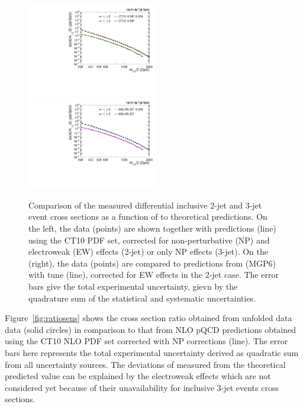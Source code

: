 \begin{figure}[!h]
 \hspace*{-5mm}\includegraphics[width=0.51\textwidth]{Plots_HT_2_150/Comparison_data_theory_EW.pdf}%
 ~~\includegraphics[width=0.51\textwidth]{Plots_HT_2_150/Comparison_data_MC_EW.pdf}\\
 \caption{Comparison of the measured differential inclusive 2-jet and 3-jet event cross sections as a function of \httwo to theoretical predictions. On the left, the data (points) are shown together with \NLOJETPP predictions (line) using the CT10 PDF set, corrected for non-perturbative (NP) and electroweak (EW) effects (2-jet) or only NP effects (3-jet). On the (right), the data (points) are compared to predictions from \MadGraphFn \plusn \PYTHIAS (MG\plusn P6) with tune \Ztwostar (line), corrected for EW effects in the 2-jet case. The error bars give the total experimental uncertainty, gievn by the quadrature sum of the statistical and systematic uncertainties.}
  \label{fig:data_NL0_MC}
\end{figure}

Figure~\ref{fig:ratiosens} shows the cross section ratio \ratio obtained from unfolded data data (solid circles) in comparison to that from NLO pQCD predictions obtained using the CT10 NLO PDF set corrected with NP corrections (line). The error bars here represents the total experimental uncertainty derived as quadratic sum from all uncertainty sources. The deviations of measured \ratio from the theoretical predicted value can be explained by the electroweak effects which are not considered yet because of their unavailability for inclusive 3-jet events cross sections.

